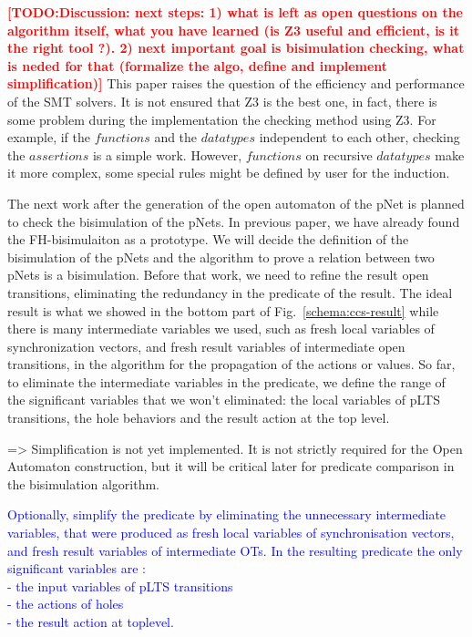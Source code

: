 \documentclass{lncs/llncs}
\newcommand{\TODO}[1]{\textcolor{red}{\textbf{[TODO:#1]}}}
\newcommand{\ERIC}[1]{\textcolor{blue}{#1}}
\newcommand{\QIN}[1]{\textcolor{airforceblue}{#1}}
\begin{document}
\TODO{Discussion: next steps: 1) what is left as open questions on the
  algorithm itself, what you have learned (is Z3 useful and efficient,
  is it the right tool ?). 2) next important goal is bisimulation
  checking, what is neded for that (formalize the algo, define and
  implement simplification)}
\QIN{
This paper raises the question of the efficiency and performance of the SMT solvers. It is not ensured that Z3 is the best one, in fact, there is some problem during the implementation the checking method using Z3. For example, if the $functions$ and the $datatypes$ independent to each other, checking the $assertions$ is a simple work. However, $functions$ on recursive $datatypes$ make it more complex, some special rules might be defined by user for the induction.
}

\QIN{
The next work after the generation of the open automaton of the pNet is planned to check the bisimulation of the pNets. In previous paper, we have already found the FH-bisimulaiton\cite{meiji-sccs} as a prototype. We will decide the definition of the bisimulation of the pNets and the algorithm to prove a relation between two pNets is a bisimulation. Before that work, we need to refine the result open transitions, eliminating the redundancy in the predicate of the result. The ideal result is what we showed in the bottom part of Fig.~\ref{schema:ccs-result} while there is many intermediate variables we used, such as fresh local variables of synchronization vectors, and fresh result variables of intermediate open transitions, in the algorithm for the propagation of the actions or values. So far, to eliminate the intermediate variables in the predicate, we define the range of the significant variables that we won't eliminated: the local variables of pLTS transitions, the hole behaviors and the result action at the top level. 
}
  
=> Simplification is not yet implemented. It is not strictly required
for the Open Automaton construction, but it will be critical later for
predicate comparison in the bisimulation algorithm.

\ERIC{Optionally, simplify the predicate by eliminating the unnecessary intermediate variables, that were produced as fresh local variables of synchronisation vectors, and fresh result variables of intermediate OTs. In the resulting predicate the only significant variables are :\\
- the input variables of pLTS transitions\\
- the actions of holes\\
- the result action at toplevel.}



% 


\end{document}
